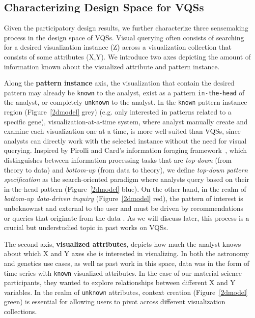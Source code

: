\subsection{Characterizing Design Space for VQSs}
Given the participatory design results, we further characterize three sensemaking process in the design space of VQSs. Visual querying often consists of searching for a desired visualization instance (Z) across a visualization collection that consists of some attributes (X,Y). We introduce two axes depicting the amount of information known about the visualized attribute and pattern instance.%
\par Along the \textbf{pattern instance} axis, the visualization that contain the desired pattern may already be \texttt{known} to the analyst, exist as a pattern \texttt{in-the-head} of the analyst, or completely \texttt{unknown} to the analyst. In the \texttt{known} pattern instance region (Figure~\ref{2dmodel} grey) (e.g. only interested in patterns related to a specific gene), visualization-at-a-time system, where analyst manually create and examine each visualization one at a time, is more well-suited than VQSs, since analysts can directly work with the selected instance without the need for visual querying. Inspired by Pirolli and Card's information foraging framework~\cite{Pirolli}, which distinguishes between information processing tasks that are \textit{top-down} (from theory to data) and \textit{bottom-up} (from data to theory), we define \textit{top-down pattern specification} as the search-oriented paradigm where analysts query based on their in-the-head pattern (Figure~\ref{2dmodel} blue). On the other hand, in the realm of \textit{bottom-up data-driven inquiry} (Figure~\ref{2dmodel} red), the pattern of interest is unbeknownst and external to the user and must be driven by recommendations or queries that originate from the data . As we will discuss later, this process is a crucial but understudied topic in past works on VQSs.
\par The second axis, \textbf{visualized attributes}, depicts how much the analyst knows about which X and Y axes she is interested in visualizing. In both the astronomy and genetics use cases, as well as past work in this space, data was in the form of time series with \texttt{known} visualized attributes. In the case of our material science participants, they wanted to explore relationships between different X and Y variables. In the realm of \texttt{unknown} attributes, context creation (Figure~\ref{2dmodel} green) is essential for allowing users to pivot across different visualization collections.%
